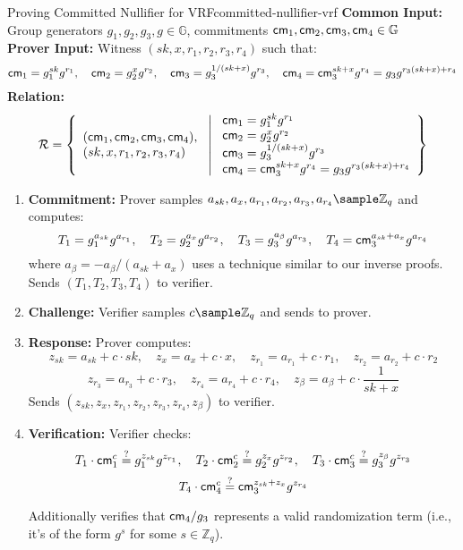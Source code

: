 \begin{protocol}{Proving Committed Nullifier for VRF}{committed-nullifier-vrf}\label{pok-committed-nullifier-vrf}
\textbf{Common Input:} Group generators $g_1, g_2, g_3, g \in \mathbb{G}$, commitments $\mathsf{cm}_1, \mathsf{cm}_2, \mathsf{cm}_3, \mathsf{cm}_4 \in \mathbb{G}$ \\
\textbf{Prover Input:} Witness $(sk, x, r_1, r_2, r_3, r_4)$ such that:
    \[
    \mathsf{cm}_1 = g_1^{sk} g^{r_1}, \quad \mathsf{cm}_2 = g_2^{x} g^{r_2}, \quad \mathsf{cm}_3 = g_3^{1/(sk + x)} g^{r_3}, \quad \mathsf{cm}_4 = \mathsf{cm}_3^{sk + x} g^{r_4} = g_3 g^{r_3 (sk + x) + r_4}
    \]
\textbf{Relation:}
\[
\mathcal{R} = \left\{ 
\begin{array}{l} 
(\mathsf{cm}_1, \mathsf{cm}_2, \mathsf{cm}_3, \mathsf{cm}_4), \\
(sk, x, r_1, r_2, r_3, r_4) 
\end{array}
\ \middle| \
\begin{array}{l}
\mathsf{cm}_1 = g_1^{sk} g^{r_1} \\
\mathsf{cm}_2 = g_2^{x} g^{r_2} \\
\mathsf{cm}_3 = g_3^{1/(sk + x)} g^{r_3} \\
\mathsf{cm}_4 = \mathsf{cm}_3^{sk + x} g^{r_4} = g_3 g^{r_3 (sk + x) + r_4}
\end{array} \right\}
\]
\begin{enumerate}
    \item \textbf{Commitment:} Prover samples $a_{sk}, a_x, a_{r_1}, a_{r_2}, a_{r_3}, a_{r_4} \sample \mathbb{Z}_q$ and computes:
       \[
       T_1 = g_1^{a_{sk}} g^{a_{r_1}}, \quad T_2 = g_2^{a_x} g^{a_{r_2}}, \quad T_3 = g_3^{a_{\beta}} g^{a_{r_3}}, \quad T_4 = \mathsf{cm}_3^{a_{sk} + a_x} g^{a_{r_4}}
       \]
       where $a_{\beta} = -a_{\beta}/(a_{sk} + a_x)$ uses a technique similar to our inverse proofs. Sends $(T_1, T_2, T_3, T_4)$ to verifier.
    
    \item \textbf{Challenge:} Verifier samples $c \sample \mathbb{Z}_q$ and sends to prover.
    
    \item \textbf{Response:} Prover computes:
       \[
       z_{sk} = a_{sk} + c \cdot sk, \quad z_x = a_x + c \cdot x, \quad z_{r_1} = a_{r_1} + c \cdot r_1, \quad z_{r_2} = a_{r_2} + c \cdot r_2
       \]
       \[
       z_{r_3} = a_{r_3} + c \cdot r_3, \quad z_{r_4} = a_{r_4} + c \cdot r_4, \quad z_{\beta} = a_{\beta} + c \cdot \frac{1}{sk + x}
       \]
       Sends $(z_{sk}, z_x, z_{r_1}, z_{r_2}, z_{r_3}, z_{r_4}, z_{\beta})$ to verifier.
    
    \item \textbf{Verification:} Verifier checks:
       \[
       T_1 \cdot \mathsf{cm}_1^c \stackrel{?}{=} g_1^{z_{sk}} g^{z_{r_1}}, \quad T_2 \cdot \mathsf{cm}_2^c \stackrel{?}{=} g_2^{z_x} g^{z_{r_2}}, \quad T_3 \cdot \mathsf{cm}_3^c \stackrel{?}{=} g_3^{z_{\beta}} g^{z_{r_3}}
       \]
       \[
       T_4 \cdot \mathsf{cm}_4^c \stackrel{?}{=} \mathsf{cm}_3^{z_{sk} + z_x} g^{z_{r_4}}
       \]
       
       Additionally verifies that $\mathsf{cm}_4 / g_3$ represents a valid randomization term (i.e., it's of the form $g^s$ for some $s \in \mathbb{Z}_q$).
\end{enumerate}
\end{protocol}

